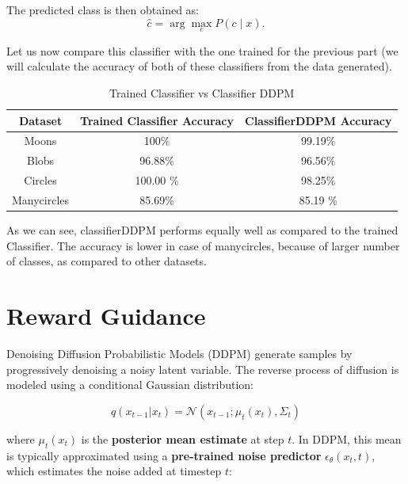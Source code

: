 \documentclass[a4paper,12pt]{article}
\begin{document}
The predicted class is then obtained as:
\begin{equation}
\hat{c} = \arg\max_c P(c \mid x).
\end{equation}

Let us now compare this classifier with the one trained for the previous part (we will calculate the accuracy of both of these classifiers from the data generated).

\begin{table}[h]
  \centering
  \begin{tabular}{|c|c|c|}
      \hline
      {\bf Dataset} & {\bf Trained Classifier Accuracy} & {\bf ClassifierDDPM Accuracy} \\
      \hline
      Moons & 100\% & 99.19\% \\
      Blobs & 96.88\% & 96.56\%\\
      Circles & 100.00 \% & 98.25\% \\
      Manycircles & 85.69\% & 85.19 \%\\
      \hline
  \end{tabular}
  \caption{Trained Classifier vs Classifier DDPM}
  \label{tab:classify}
\end{table}

As we can see, classifierDDPM performs equally well as compared to the trained Classifier. The accuracy is lower in case of manycircles, because of larger number of classes, as compared to other datasets.




\clearpage



\section*{Reward Guidance}

Denoising Diffusion Probabilistic Models (DDPM) generate samples by progressively denoising a noisy latent variable. The reverse process of diffusion is modeled using a conditional Gaussian distribution:

\begin{equation}
q(x_{t-1} | x_t) = \mathcal{N} (x_{t-1} ; \mu_t(x_t), \Sigma_t)
\end{equation}

where $\mu_t(x_t)$ is the \textbf{posterior mean estimate} at step $t$. In DDPM, this mean is typically approximated using a \textbf{pre-trained noise predictor} $\epsilon_\theta(x_t, t)$, which estimates the noise added at timestep $t$:
\end{document}
